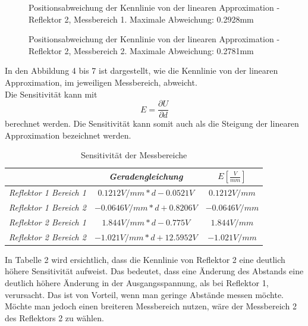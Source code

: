 \documentclass[a4paper,12pt]{article}
\begin{document}
	\begin{figure}[H]
		\centering
		\caption{Positionsabweichung der Kennlinie von der linearen Approximation - Reflektor 2, Messbereich 1. Maximale Abweichung: 0.2928mm}
	\end{figure}
	\begin{figure}[H]
		\centering
		\caption{Positionsabweichung der Kennlinie von der linearen Approximation - Reflektor 2, Messbereich 2. Maximale Abweichung: 0.2781mm}
	\end{figure}
	\noindent
	In den Abbildung 4 bis 7 ist dargestellt, wie die Kennlinie von der linearen Approximation, im jeweiligen Messbereich, abweicht.\\ \newline
	Die Sensitivität kann mit \[
	E = \frac{\partial U}{\partial d}
	\] berechnet werden. Die Sensitivität kann somit auch als die Steigung der linearen Approximation bezeichnet werden.\\ \newline
	\begin{table}[h]
		\centering
		\begin{tabular}{|c|c|c|}
			\hline
			\textit{} & \textit{Geradengleichung} & $E[\frac{V}{mm}]$ \\ \hline
			\textit{Reflektor 1 Bereich 1} & $0.1212 V/mm * d - 0.0521V$ & $0.1212 V/mm$ \\ \hline
			\textit{Reflektor 1 Bereich 2} & $-0.0646 V/mm * d + 0.8206V$ & $-0.0646 V/mm$ \\ \hline
			\textit{Reflektor 2 Bereich 1} & $1.844 V/mm * d - 0.775V$ & $1.844 V/mm$ \\ \hline
			\textit{Reflektor 2 Bereich 2} & $-1.021 V/mm * d + 12.5952V$ & $-1.021 V/mm$ \\ \hline
		\end{tabular}
		\caption{Sensitivität der Messbereiche}
		\label{tab:my-table}
	\end{table}\newline
	In Tabelle 2 wird ersichtlich, dass die Kennlinie von Reflektor 2 eine deutlich höhere Sensitivität aufweist. Das bedeutet, dass eine Änderung des Abstands eine deutlich höhere Änderung in der Ausgangsspannung, als bei Reflektor 1, verursacht. Das ist von Vorteil, wenn man geringe Abstände messen möchte.\newline
	Möchte man jedoch einen breiteren Messbereich nutzen, wäre der Messbereich 2 des Reflektors 2 zu wählen.\\ \newline
	
\end{document}
